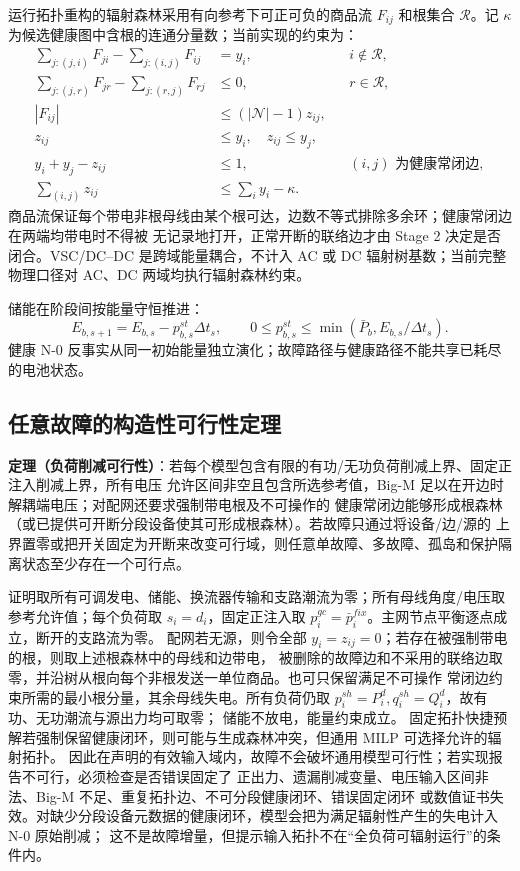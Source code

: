 运行拓扑重构的辐射森林采用有向参考下可正可负的商品流 $F_{ij}$ 和根集合 $\mathcal R$。记
$\kappa$ 为候选健康图中含根的连通分量数；当前实现的约束为：
\begin{align}
 \sum_{j:(j,i)}F_{ji}-\sum_{j:(i,j)}F_{ij}&=y_i, &&i\notin\mathcal R,\\
 \sum_{j:(j,r)}F_{jr}-\sum_{j:(r,j)}F_{rj}&\le 0, &&r\in\mathcal R,\\
 |F_{ij}|&\le (|\mathcal N|-1)z_{ij},\\
 z_{ij}&\le y_i,\quad z_{ij}\le y_j,\\
 y_i+y_j-z_{ij}&\le 1, &&(i,j)\text{ 为健康常闭边},\\
 \sum_{(i,j)}z_{ij}&\le\sum_i y_i-\kappa.
 \end{align}
商品流保证每个带电非根母线由某个根可达，边数不等式排除多余环；健康常闭边在两端均带电时不得被
无记录地打开，正常开断的联络边才由 Stage 2 决定是否闭合。VSC/DC--DC 是跨域能量耦合，不计入 AC
或 DC 辐射树基数；当前完整物理口径对 AC、DC 两域均执行辐射森林约束。

储能在阶段间按能量守恒推进：
\begin{equation}
 E_{b,s+1}=E_{b,s}-p_{b,s}^{st}\Delta t_s,\qquad
 0\le p_{b,s}^{st}\le\min(\bar P_b, E_{b,s}/\Delta t_s).
 \label{eq:physical-storage-chronology}
\end{equation}
健康 N-0 反事实从同一初始能量独立演化；故障路径与健康路径不能共享已耗尽的电池状态。

\subsection{任意故障的构造性可行性定理}
\begin{theorynote}
\textbf{定理（负荷削减可行性）}：若每个模型包含有限的有功/无功负荷削减上界、固定正注入削减上界，所有电压
允许区间非空且包含所选参考值，Big-M 足以在开边时解耦端电压；对配网还要求强制带电根及不可操作的
健康常闭边能够形成根森林（或已提供可开断分段设备使其可形成根森林）。若故障只通过将设备/边/源的
上界置零或把开关固定为开断来改变可行域，则任意单故障、多故障、孤岛和保护隔离状态至少存在一个可行点。
\end{theorynote}
证明取所有可调发电、储能、换流器传输和支路潮流为零；所有母线角度/电压取参考允许值；每个负荷取
$s_i=d_i$，固定正注入取 $p_i^{gc}=\bar p_i^{fix}$。主网节点平衡逐点成立，断开的支路流为零。
配网若无源，则令全部 $y_i=z_{ij}=0$；若存在被强制带电的根，则取上述根森林中的母线和边带电，
被删除的故障边和不采用的联络边取零，并沿树从根向每个非根发送一单位商品。也可只保留满足不可操作
常闭边约束所需的最小根分量，其余母线失电。所有负荷仍取
$p_i^{sh}=P_i^d,q_i^{sh}=Q_i^d$，故有功、无功潮流与源出力均可取零；
储能不放电，能量约束成立。
固定拓扑快捷预解若强制保留健康闭环，则可能与生成森林冲突，但通用 MILP 可选择允许的辐射拓扑。
因此在声明的有效输入域内，故障不会破坏通用模型可行性；若实现报告不可行，必须检查是否错误固定了
正出力、遗漏削减变量、电压输入区间非法、Big-M 不足、重复拓扑边、不可分段健康闭环、错误固定闭环
或数值证书失效。对缺少分段设备元数据的健康闭环，模型会把为满足辐射性产生的失电计入 N-0 原始削减；
这不是故障增量，但提示输入拓扑不在“全负荷可辐射运行”的条件内。

